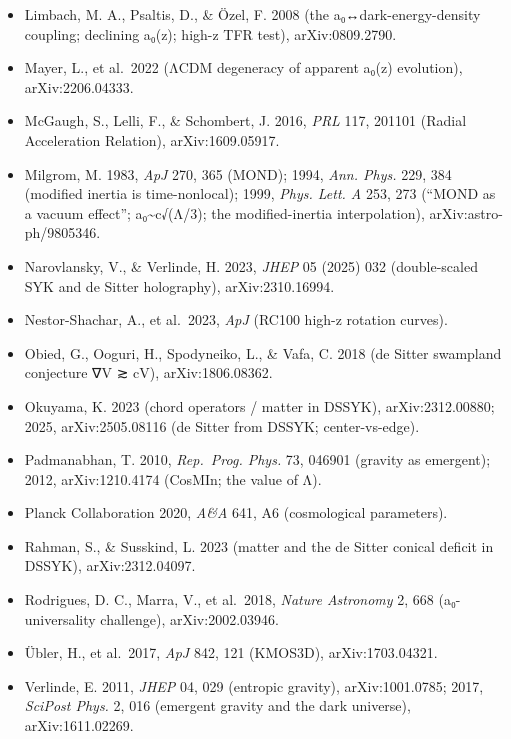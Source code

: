\documentclass[
]{article}
\begin{document}
\begin{itemize}
  (SPARC), arXiv:1606.09251; Lelli et al.~2019 (BTFR).
\item
  Limbach, M. A., Psaltis, D., \& Özel, F. 2008 (the
  a₀↔dark-energy-density coupling; declining a₀(z); high-z TFR test),
  arXiv:0809.2790.
\item
  Mayer, L., et al.~2022 (ΛCDM degeneracy of apparent a₀(z) evolution),
  arXiv:2206.04333.
\item
  McGaugh, S., Lelli, F., \& Schombert, J. 2016, \emph{PRL} 117, 201101
  (Radial Acceleration Relation), arXiv:1609.05917.
\item
  Milgrom, M. 1983, \emph{ApJ} 270, 365 (MOND); 1994, \emph{Ann. Phys.}
  229, 384 (modified inertia is time-nonlocal); 1999, \emph{Phys. Lett.
  A} 253, 273 (``MOND as a vacuum effect''; a₀\textasciitilde c√(Λ/3);
  the modified-inertia interpolation), arXiv:astro-ph/9805346.
\item
  Narovlansky, V., \& Verlinde, H. 2023, \emph{JHEP} 05 (2025) 032
  (double-scaled SYK and de Sitter holography), arXiv:2310.16994.
\item
  Nestor-Shachar, A., et al.~2023, \emph{ApJ} (RC100 high-z rotation
  curves).
\item
  Obied, G., Ooguri, H., Spodyneiko, L., \& Vafa, C. 2018 (de Sitter
  swampland conjecture \textbar∇V\textbar{} ≳ cV), arXiv:1806.08362.
\item
  Okuyama, K. 2023 (chord operators / matter in DSSYK),
  arXiv:2312.00880; 2025, arXiv:2505.08116 (de Sitter from DSSYK;
  center-vs-edge).
\item
  Padmanabhan, T. 2010, \emph{Rep.~Prog. Phys.} 73, 046901 (gravity as
  emergent); 2012, arXiv:1210.4174 (CosMIn; the value of Λ).
\item
  Planck Collaboration 2020, \emph{A\&A} 641, A6 (cosmological
  parameters).
\item
  Rahman, S., \& Susskind, L. 2023 (matter and the de Sitter conical
  deficit in DSSYK), arXiv:2312.04097.
\item
  Rodrigues, D. C., Marra, V., et al.~2018, \emph{Nature Astronomy} 2,
  668 (a₀-universality challenge), arXiv:2002.03946.
\item
  Übler, H., et al.~2017, \emph{ApJ} 842, 121 (KMOS3D),
  arXiv:1703.04321.
\item
  Verlinde, E. 2011, \emph{JHEP} 04, 029 (entropic gravity),
  arXiv:1001.0785; 2017, \emph{SciPost Phys.} 2, 016 (emergent gravity
  and the dark universe), arXiv:1611.02269.
\end{itemize}
\end{document}
